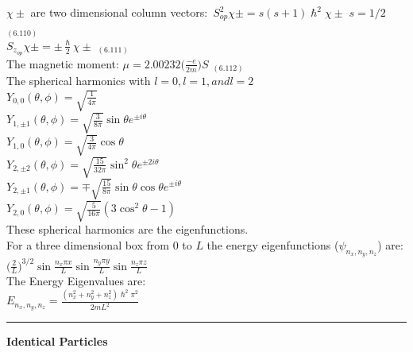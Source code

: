 \documentclass[0pt]{report}
\begin{document}
\begin{multicols*}{3}
\begin{flushleft}
$\chi\pm$ are two dimensional column vectors:\
$S_{op}^2\chi\pm=s(s+1)\hslash^2\chi\pm$ $s=1/2$ $_{(6.110)}$\\
$S_{z_{op}}\chi\pm=\pm\frac{\hslash}{2}\chi\pm$ $_{(6.111)}$\\
The magnetic moment:
$\mu=2.00232\Big(\frac{-e}{2m}\Big)S$ $_{(6.112)}$\\
The spherical harmonics with $l=0,l=1, and l=2$\\
$Y_{0,0}(\theta,\phi)=\sqrt{\frac{1}{4\pi}}$\\
$Y_{1,\pm 1}(\theta,\phi)=\sqrt{\frac{3}{8\pi}}\sin\theta e^{\pm i\theta}$\\
$Y_{1,0}(\theta,\phi)=\sqrt{\frac{3}{4\pi}}\cos\theta$\\
$Y_{2,\pm 2}(\theta,\phi)=\sqrt{\frac{15}{32\pi}}\sin^2\theta e^{\pm 2i\theta}$\\
$Y_{2,\pm 1}(\theta,\phi)=\mp \sqrt{\frac{15}{8\pi}}\sin\theta\cos\theta e^{\pm i\theta}$\\
$Y_{2,0}(\theta,\phi)=\sqrt{\frac{5}{16\pi}}(3\cos^2\theta-1)$\\
These spherical harmonics are the eigenfunctions.\\
For a three dimensional box from $0$ to $L$ the energy eigenfunctions ($\psi_{n_x,n_y,n_z}$) are:\\
$\Big(\frac{2}{L}\Big)^{3/2}\sin\frac{n_x\pi x}{L}\sin\frac{n_y\pi y}{L}\sin\frac{n_z\pi z}{L}$\\
The Energy Eigenvalues are:\\
$E_{n_x,n_y,n_z}=\frac{(n_x^2+n_y^2+n_z^2)\hslash^2\pi^2}{2mL^2}$\\

\noindent\rule[0.5ex]{\linewidth}{1pt}
\textbf{Identical Particles}\\



\end{flushleft}
\end{multicols*}
\end{document}
